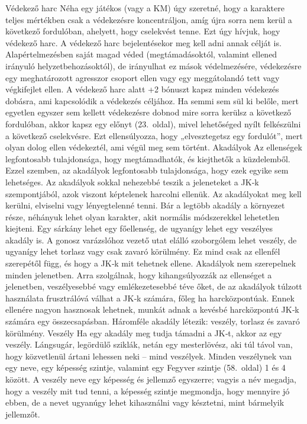 \documentclass[oneside]{book}
\newcommand{\page}[1]{#1.~oldal}
\begin{document}
Védekező harc
Néha egy játékos (vagy a KM) úgy szeretné, hogy a karaktere teljes mértékben csak a védekezésre koncentráljon, amíg újra sorra nem kerül a következő fordulóban, ahelyett, hogy cselekvést tenne. Ezt úgy hívjuk, hogy védekező harc.
A védekező harc bejelentésekor meg kell adni annak célját is. Alapértelmezésben saját magad véded (megtámadásoktól, valamint ellened irányuló helyzetbehozásoktól), de irányulhat ez mások védelmezésére, védekezésre egy meghatározott agresszor csoport ellen vagy egy meggátolandó tett vagy végkifejlet ellen.
A védekező harc alatt +2 bónuszt kapsz minden védekezés dobásra, ami kapcsolódik a védekezés céljához.
Ha semmi sem sül ki belőle, mert egyetlen egyszer sem kellett védekezésre dobnod mire sorra kerülsz a következő fordulóban, akkor kapsz egy előnyt (\page{23}), mivel lehetőséged nyílt felkészülni a következő cselekvésre. Ezt ellensúlyozza, hogy „elvesztegetsz egy fordulót”, mert olyan dolog ellen védekeztél, ami végül meg sem történt.
Akadályok
Az ellenségek legfontosabb tulajdonsága, hogy megtámadhatók, és kiejthetők a küzdelemből. Ezzel szemben, az akadályok legfontosabb tulajdonsága, hogy ezek egyike sem lehetséges. Az akadályok sokkal nehezebbé teszik a jeleneteket a JK‑k szempontjából, azok viszont képtelenek harcolni ellenük. Az akadályokat meg kell kerülni, elviselni vagy lényegtelenné tenni.
Bár a legtöbb akadály a környezet része, néhányuk lehet olyan karakter, akit normális módszerekkel lehetetlen kiejteni. Egy sárkány lehet egy főellenség, de ugyanígy lehet egy veszélyes akadály is. A gonosz varázslóhoz vezető utat elálló szoborgólem lehet veszély, de ugyanígy lehet torlasz vagy csak zavaró körülmény. Ez mind csak az ellenfél szerepétől függ, és hogy a JK‑k mit tehetnek ellene.
Akadályok nem szerepelnek minden jelenetben. Arra szolgálnak, hogy kihangsúlyozzák az ellenséget a jelenetben, veszélyesebbé vagy emlékezetesebbé téve őket, de az akadályok túlzott használata frusztrálóvá válhat a JK‑k számára, főleg ha harcközpontúak. Ennek ellenére nagyon hasznosak lehetnek, munkát adnak a kevésbé harcközpontú JK‑k számára egy összecsapásban.
Háromféle akadály létezik: veszély, torlasz és zavaró körülmény.
Veszély
Ha egy akadály meg tudja támadni a JK‑t, akkor az egy veszély. Lángsugár, legördülő sziklák, netán egy mesterlövész, aki túl távol van, hogy közvetlenül ártani lehessen neki – mind veszélyek. Minden veszélynek van egy neve, egy képesség szintje, valamint egy Fegyver szintje (\page{58}) 1 és 4 között.
A veszély neve egy képesség és jellemző egyszerre; vagyis a név megadja, hogy a veszély mit tud tenni, a képesség szintje megmondja, hogy mennyire jó ebben, de a nevet ugyanúgy lehet kihasználni vagy késztetni, mint bármelyik jellemzőt.
\end{document}
